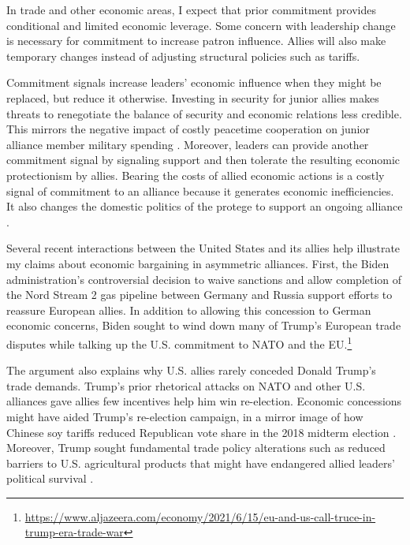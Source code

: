 \documentclass[12pt]{article}
\begin{document}
In trade and other economic areas, I expect that prior commitment provides conditional and limited economic leverage. 
Some concern with leadership change is necessary for commitment to increase patron influence. 
Allies will also make temporary changes instead of adjusting structural policies such as tariffs. 


Commitment signals increase leaders' economic influence when they might be replaced, but reduce it otherwise. 
Investing in security for junior allies makes threats to renegotiate the balance of security and economic relations less credible. 
This mirrors the negative impact of costly peacetime cooperation on junior alliance member military spending \citep{Alley2021isq}.
Moreover, leaders can provide another commitment signal by signaling support and then tolerate the resulting economic protectionism by allies. 
Bearing the costs of allied economic actions is a costly signal of commitment to an alliance because it generates economic inefficiencies. 
It also changes the domestic politics of the protege to support an ongoing alliance \citep{Lake2013}. 


Several recent interactions between the United States and its allies help illustrate my claims about economic bargaining in asymmetric alliances. 
First, the Biden administration's controversial decision to waive sanctions and allow completion of the Nord Stream 2 gas pipeline between Germany and Russia support efforts to reassure European allies. 
In addition to allowing this concession to German economic concerns, Biden sought to wind down many of Trump's European trade disputes while talking up the U.S. commitment to NATO and the EU.\footnote{\url{https://www.aljazeera.com/economy/2021/6/15/eu-and-us-call-truce-in-trump-era-trade-war}}


The argument also explains why U.S. allies rarely conceded Donald Trump's trade demands. 
Trump's prior rhetorical attacks on NATO and other U.S. alliances gave allies few incentives help him win re-election. 
Economic concessions might have aided Trump's re-election campaign, in a mirror image of how Chinese soy tariffs reduced Republican vote share in the 2018 midterm election \citep{ChyzhUrbatsch2021}. 
Moreover, Trump sought fundamental trade policy alterations such as reduced barriers to U.S. agricultural products that might have endangered allied leaders' political survival \citep{HeeParkJensen2007}.
\end{document}
